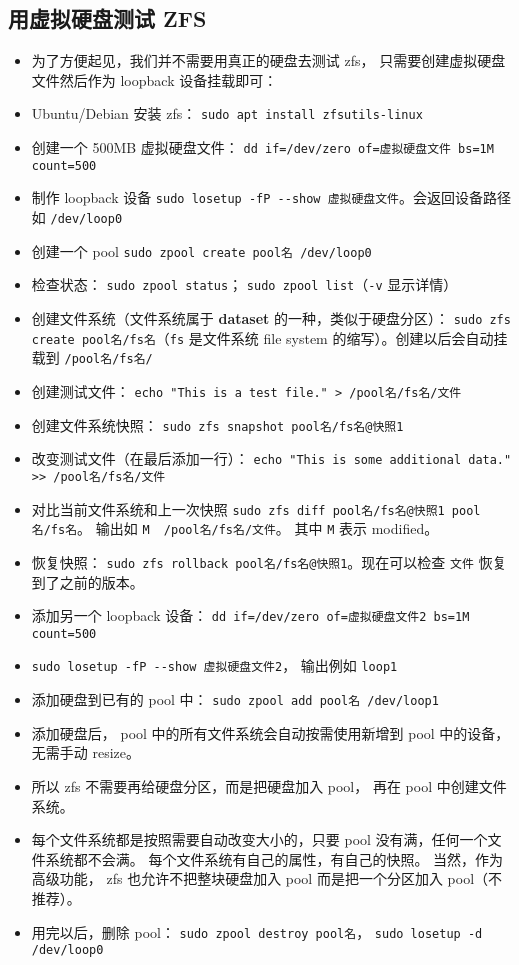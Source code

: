 \subsection{用虚拟硬盘测试 ZFS}\label{sub_ZFS_1}
\begin{itemize}
\item 为了方便起见，我们并不需要用真正的硬盘去测试 zfs， 只需要创建虚拟硬盘文件然后作为 loopback 设备挂载即可：
\item Ubuntu/Debian 安装 zfs： \verb`sudo apt install zfsutils-linux`
\item 创建一个 500MB 虚拟硬盘文件： \verb`dd if=/dev/zero of=虚拟硬盘文件 bs=1M count=500`
\item 制作 loopback 设备 \verb`sudo losetup -fP --show 虚拟硬盘文件`。会返回设备路径如 \verb`/dev/loop0`
\item 创建一个 pool \verb`sudo zpool create pool名 /dev/loop0`
\item 检查状态： \verb`sudo zpool status`； \verb`sudo zpool list`（\verb`-v` 显示详情）
\item 创建文件系统（文件系统属于 \textbf{dataset} 的一种，类似于硬盘分区）： \verb`sudo zfs create pool名/fs名`（\verb`fs` 是文件系统 file system 的缩写）。创建以后会自动挂载到 \verb`/pool名/fs名/`
\item 创建测试文件： \verb`echo "This is a test file." > /pool名/fs名/文件`
\item 创建文件系统快照： \verb`sudo zfs snapshot pool名/fs名@快照1`
\item 改变测试文件（在最后添加一行）： \verb`echo "This is some additional data." >> /pool名/fs名/文件`
\item 对比当前文件系统和上一次快照 \verb`sudo zfs diff pool名/fs名@快照1 pool名/fs名`。 输出如 \verb`M	/pool名/fs名/文件`。 其中 \verb`M` 表示 modified。
\item 恢复快照： \verb`sudo zfs rollback pool名/fs名@快照1`。现在可以检查 \verb`文件` 恢复到了之前的版本。
\item 添加另一个 loopback 设备： \verb`dd if=/dev/zero of=虚拟硬盘文件2 bs=1M count=500`
\item \verb`sudo losetup -fP --show 虚拟硬盘文件2`， 输出例如 \verb`loop1`
\item 添加硬盘到已有的 pool 中： \verb`sudo zpool add pool名 /dev/loop1`
\item 添加硬盘后， pool 中的所有文件系统会自动按需使用新增到 pool 中的设备，无需手动 resize。
\item 所以 zfs 不需要再给硬盘分区，而是把硬盘加入 pool， 再在 pool 中创建文件系统。
\item 每个文件系统都是按照需要自动改变大小的，只要 pool 没有满，任何一个文件系统都不会满。
每个文件系统有自己的属性，有自己的快照。 当然，作为高级功能， zfs 也允许不把整块硬盘加入 pool 而是把一个分区加入 pool（不推荐）。
\item 用完以后，删除 pool： \verb`sudo zpool destroy pool名`， \verb`sudo losetup -d /dev/loop0`
\end{itemize}

